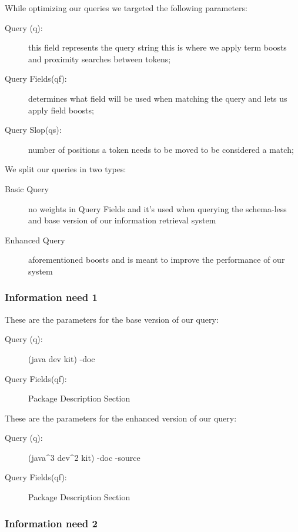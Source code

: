 While optimizing our queries we targeted the following parameters:
\begin{description}
    \item [Query (q):] this field represents the query string this is where we apply term boosts and proximity searches between tokens;
    \item [Query Fields(qf):] determines what field will be used when matching the query and lets us apply field boosts;
    \item [Query Slop(qs):] number of positions a token needs to be moved to be considered a match;
\end{description}

We split our queries in two types:

\begin{description}
    \item[Basic Query] no weights in Query Fields and it's used when querying the schema-less and base version of our information retrieval system
    \item[Enhanced Query] aforementioned boosts and is meant to improve the performance of our system
\end{description}


\subsubsection{Information need 1}

These are the parameters for the base version of our query:

\begin{description}
    \item [Query (q):] (java dev kit) -doc
    \item [Query Fields(qf):] Package Description Section
\end{description}

These are the parameters for the enhanced version of our query:

\begin{description}
    \item [Query (q):] (java\^{}3 dev\^{}2 kit) -doc -source
    \item [Query Fields(qf):] Package Description Section
\end{description}

\subsubsection{Information need 2}

